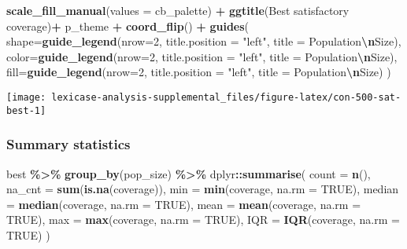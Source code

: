 \documentclass[
]{book}
\newenvironment{Shaded}{\begin{snugshade}}{\end{snugshade}}
\newcommand{\AttributeTok}[1]{\textcolor[rgb]{0.13,0.29,0.53}{#1}}
\newcommand{\ConstantTok}[1]{\textcolor[rgb]{0.56,0.35,0.01}{#1}}
\newcommand{\DecValTok}[1]{\textcolor[rgb]{0.00,0.00,0.81}{#1}}
\newcommand{\FunctionTok}[1]{\textcolor[rgb]{0.13,0.29,0.53}{\textbf{#1}}}
\newcommand{\NormalTok}[1]{#1}
\newcommand{\SpecialCharTok}[1]{\textcolor[rgb]{0.81,0.36,0.00}{\textbf{#1}}}
\newcommand{\StringTok}[1]{\textcolor[rgb]{0.31,0.60,0.02}{#1}}
\begin{document}
\begin{Shaded}
\begin{Highlighting}[]
  \FunctionTok{scale\_fill\_manual}\NormalTok{(}\AttributeTok{values =}\NormalTok{ cb\_palette) }\SpecialCharTok{+}
  \FunctionTok{ggtitle}\NormalTok{(}\StringTok{\textquotesingle{}Best satisfactory coverage\textquotesingle{}}\NormalTok{)}\SpecialCharTok{+}
\NormalTok{  p\_theme }\SpecialCharTok{+} \FunctionTok{coord\_flip}\NormalTok{() }\SpecialCharTok{+}
  \FunctionTok{guides}\NormalTok{(}
    \AttributeTok{shape=}\FunctionTok{guide\_legend}\NormalTok{(}\AttributeTok{nrow=}\DecValTok{2}\NormalTok{, }\AttributeTok{title.position =} \StringTok{"left"}\NormalTok{, }\AttributeTok{title =} \StringTok{\textquotesingle{}Population}\SpecialCharTok{\textbackslash{}n}\StringTok{Size\textquotesingle{}}\NormalTok{),}
    \AttributeTok{color=}\FunctionTok{guide\_legend}\NormalTok{(}\AttributeTok{nrow=}\DecValTok{2}\NormalTok{, }\AttributeTok{title.position =} \StringTok{"left"}\NormalTok{, }\AttributeTok{title =} \StringTok{\textquotesingle{}Population}\SpecialCharTok{\textbackslash{}n}\StringTok{Size\textquotesingle{}}\NormalTok{),}
    \AttributeTok{fill=}\FunctionTok{guide\_legend}\NormalTok{(}\AttributeTok{nrow=}\DecValTok{2}\NormalTok{, }\AttributeTok{title.position =} \StringTok{"left"}\NormalTok{, }\AttributeTok{title =} \StringTok{\textquotesingle{}Population}\SpecialCharTok{\textbackslash{}n}\StringTok{Size\textquotesingle{}}\NormalTok{)}
\NormalTok{  )}
\end{Highlighting}
\end{Shaded}

\texttt{[image: lexicase-analysis-supplemental\_files/figure-latex/con-500-sat-best-1]}

\hypertarget{summary-statistics-5}{%
\subsubsection{Summary statistics}\label{summary-statistics-5}}

\begin{Shaded}
\begin{Highlighting}[]
\NormalTok{best }\SpecialCharTok{\%\textgreater{}\%}
  \FunctionTok{group\_by}\NormalTok{(pop\_size) }\SpecialCharTok{\%\textgreater{}\%}
\NormalTok{  dplyr}\SpecialCharTok{::}\FunctionTok{summarise}\NormalTok{(}
    \AttributeTok{count =} \FunctionTok{n}\NormalTok{(),}
    \AttributeTok{na\_cnt =} \FunctionTok{sum}\NormalTok{(}\FunctionTok{is.na}\NormalTok{(coverage)),}
    \AttributeTok{min =} \FunctionTok{min}\NormalTok{(coverage, }\AttributeTok{na.rm =} \ConstantTok{TRUE}\NormalTok{),}
    \AttributeTok{median =} \FunctionTok{median}\NormalTok{(coverage, }\AttributeTok{na.rm =} \ConstantTok{TRUE}\NormalTok{),}
    \AttributeTok{mean =} \FunctionTok{mean}\NormalTok{(coverage, }\AttributeTok{na.rm =} \ConstantTok{TRUE}\NormalTok{),}
    \AttributeTok{max =} \FunctionTok{max}\NormalTok{(coverage, }\AttributeTok{na.rm =} \ConstantTok{TRUE}\NormalTok{),}
    \AttributeTok{IQR =} \FunctionTok{IQR}\NormalTok{(coverage, }\AttributeTok{na.rm =} \ConstantTok{TRUE}\NormalTok{)}
\NormalTok{  )}
\end{Highlighting}
\end{Shaded}
\end{document}
